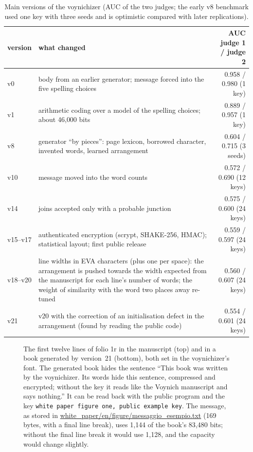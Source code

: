 \begin{table}[htbp]
\centering\footnotesize
\caption{Main versions of the voynichizer (AUC of the two judges; the early v8 benchmark used one key with three seeds
and is optimistic compared with later replications).}
\label{tab:versions}
\begin{tabularx}{\linewidth}{lYr}
\toprule
version & what changed & AUC judge 1 / judge 2 \\
\midrule
v0 & body from an earlier generator; message forced into the five spelling choices & 0.958 / 0.980 (1 key) \\
v1 & arithmetic coding over a model of the spelling choices; about 46{,}000 bits & 0.889 / 0.957 (1 key) \\
v8 & generator ``by pieces'': page lexicon, borrowed character, invented words, learned arrangement & 0.604 / 0.715 (3 seeds) \\
v10 & message moved into the word counts & 0.572 / 0.690 (12 keys) \\
v14 & joins accepted only with a probable junction & 0.575 / 0.600 (24 keys) \\
v15--v17 & authenticated encryption (scrypt, SHAKE-256, HMAC); statistical layout; first public release & 0.559 / 0.597 (24 keys) \\
v18--v20 & line widths in EVA characters (plus one per space): the arrangement is pushed towards the width expected from the manuscript for each line's number of words; the weight of similarity with the word two places away re-tuned & 0.560 / 0.607 (24 keys) \\
v21 & v20 with the correction of an initialisation defect in the arrangement (found by reading the public code) & 0.554 / 0.601 (24 keys) \\
\bottomrule
\end{tabularx}
\end{table}

\begin{figure}[p]
\centering\footnotesize

\caption{The first twelve lines of folio 1r in the manuscript (top) and in a book generated by version~21 (bottom), both
set in the voynichizer's font. The generated book hides the sentence ``This book was written by the voynichizer. Its words hide
this sentence, compressed and encrypted; without the key it reads like the Voynich manuscript and says nothing.'' It can
be read back with the public program and the key \texttt{white paper figure one, public example key}. The message, as stored
in \url{white_paper/en/figure/messaggio_esempio.txt} (169 bytes, with a final line break), uses 1{,}144 of the book's
83{,}480 bits; without the final line break it would use 1{,}128, and the capacity would change slightly.}
\label{fig:page}
\end{figure}
